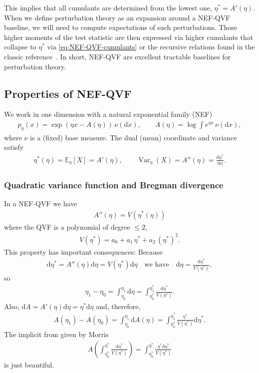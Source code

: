 \documentclass[a4paper,11pt]{article}
\numberwithin{equation}{section}
\theoremstyle{plain}
\theoremstyle{definition}
\theoremstyle{remark}
\newcommand{\1}{\ensuremath{\mathds{1}}\xspace}
\newcommand{\dd}{\ensuremath{{\textrm{d}}}\xspace}
\newcommand{\E}{{\ensuremath{{\mathbb{E}}}}\xspace}
\DeclareMathOperator{\Var}{Var}
\begin{document}
This implies that all cumulants are determined from the lowest one, $\eta^\ast=A'(\eta)$. When we define perturbation theory as an expansion around a NEF-QVF baseline, we will need to compute expectations of such perturbations. Those higher moments of the test statistic are then expressed via higher cumulants that collapse to $\eta^\ast$ via \eqref{eq:NEF-QVF-cumulants} or the recursive relations found in the classic reference~\cite{Morris82}. In short, NEF-QVF are excellent tractable baselines for perturbation theory.

\subsection{Properties of NEF-QVF}
We work in one dimension with a natural exponential family (NEF)
\begin{align}
p_\eta(x)=\exp(\eta x-A(\eta))\,\nu(\dd x),
\qquad 
A(\eta)=\log\int e^{\eta x}\,\nu(\dd x),
\end{align}
where $\nu$ is a (fixed) base measure. The dual (mean) coordinate and variance satisfy
\begin{align}
\eta^\ast(\eta)=\E_\eta[X]=A'(\eta),
\qquad 
\Var_\eta(X)=A''(\eta)=\frac{\dd \eta^\ast}{\dd\eta}.
\end{align}
\subsubsection{Quadratic variance function and Bregman divergence}
In a NEF-QVF we have
\begin{align}
A''(\eta)=V(\eta^\ast(\eta))
\end{align}
where the QVF is a polynomial of degree $\le 2$,
\begin{align}
V(\eta^\ast)=a_0+a_1\,\eta^\ast+a_2\,(\eta^\ast)^2.
\end{align}
This property has important consequences: Because
\begin{align}
    \dd\eta^\ast=A''(\eta)\dd\eta=V(\eta^\ast)\dd\eta\quad\text{we have}\quad\dd\eta=\frac{\dd\eta^\ast}{V(\eta^\ast)},
\end{align}
so
\begin{align}
    \eta_1-\eta_0=\int_{\eta_0}^{\eta_1}\dd \eta=\int_{\eta_0^\ast}^{\eta_1^\ast}\frac{\dd\eta^\ast}{V(\eta^\ast)}.
\end{align}
Also, $\dd A = A'(\eta)\dd\eta=\eta^\ast\dd\eta$  and, therefore,
\begin{align}
    A(\eta_1)-A(\eta_0)=\int_{\eta_0}^{\eta_1}\dd A(\eta)=\int_{\eta_0^\ast}^{\eta_1^\ast}\frac{\eta^\ast}{V(\eta^\ast)}\dd\eta^\ast.
\end{align}
The implicit from given by Morris~\cite{Morris82}
\begin{align}
    A\left(\int_{\eta^\ast_0}^{\eta^\ast}\frac{\dd\eta^\ast}{V(\eta^\ast)}\right)=\int_{\eta^\ast_0}^{\eta^\ast}\frac{\eta^\ast\dd\eta^\ast}{V(\eta^\ast)}
\end{align}
is just beautiful.
\end{document}
